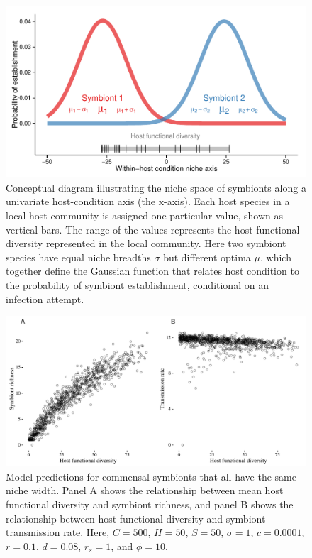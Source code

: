 \documentclass[12pt]{article}
\begin{document}
\begin{figure}[ht]\centering
\includegraphics[width=\linewidth]{fig/niche.pdf}
\caption{Conceptual diagram illustrating the niche space of symbionts along a univariate host-condition axis (the x-axis). Each host species in a local host community is assigned one particular value, shown as vertical bars. The range of the values represents the host functional diversity represented in the local community. Here two symbiont species have equal niche breadths $\sigma$ but different optima $\mu$, which together define the Gaussian function that relates host condition to the probability of symbiont establishment, conditional on an infection attempt.}
\label{fig:niche}
\end{figure}

\newpage

\begin{figure}[ht]\centering
\includegraphics[width=\linewidth]{fig/fig1.pdf}
\caption{Model predictions for commensal symbionts that all have the same niche width. Panel A shows the relationship between mean host functional diversity and symbiont richness, and panel B shows the relationship between host functional diversity and symbiont transmission rate. Here, $C=500$, $H=50$, $S=50$, $\sigma = 1$, $c=0.0001$, $r=0.1$, $d=0.08$, $r_s=1$, and $\phi = 10$.}
\label{f2}
\end{figure}
\end{document}
